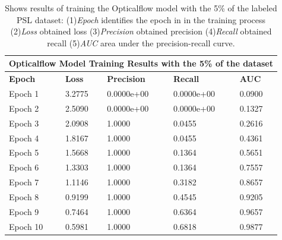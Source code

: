 \documentclass[twocolumn,conference]{article}
\begin{document}
\begin{table}
\captionsetup{font=footnotesize}
\centering
\begin{tabular}{ p{2.8cm} p{2.8cm} p{2.8cm} p{2.8cm} p{2.8cm} }
\toprule
\multicolumn{5}{c}{\textbf{Opticalflow Model Training Results with the 5\% of the dataset}} \\
\hline
\hline
\textbf{Epoch}&	\textbf{Loss}	&\textbf{Precision}	&\textbf{Recall}	&\textbf{AUC} \\
\hline
\midrule
Epoch 1&	3.2775&	0.0000e+00&	0.0000e+00&	0.0900\\
Epoch 2&	2.5090&	0.0000e+00&	0.0000e+00&	0.1327\\
Epoch 3&	2.0908&	1.0000&	0.0455&	0.2616\\
Epoch 4&	1.8167&	1.0000&	0.0455&	0.4361\\
Epoch 5&	1.5668&	1.0000&	0.1364&	0.5651\\
Epoch 6&	1.3303&	1.0000&	0.1364&	0.7557\\
Epoch 7&	1.1146&	1.0000&	0.3182&	0.8657\\
Epoch 8&	0.9199&	1.0000&	0.4545&	0.9205\\
Epoch 9&	0.7464&	1.0000&	0.6364&	0.9657\\
Epoch 10&	0.5981&	1.0000&	0.6818&	0.9877\\
\bottomrule
\end{tabular}
\caption{Shows results of training the Opticalflow model with the 5\% of the labeled PSL dataset: (1)\textit{Epoch} identifies the epoch in in the training process (2)\textit{Loss} obtained loss (3)\textit{Precision} obtained precision (4)\textit{Recall} obtained recall (5)\textit{AUC} area under the precision-recall curve.}
\label{tab:opticalflow-detection-results-5-percent}
\end{table}
\end{document}
